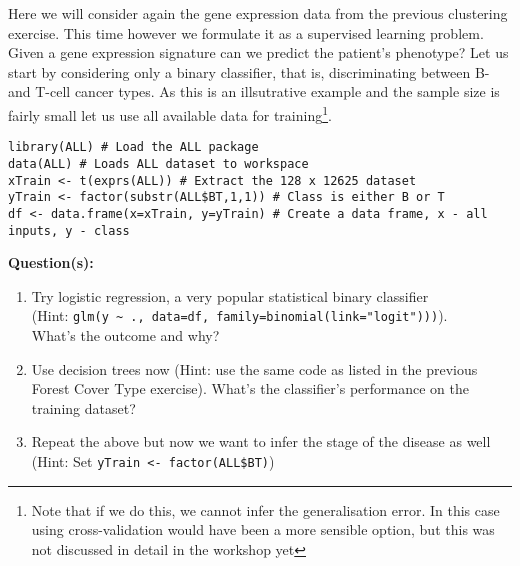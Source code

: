 \documentclass[a4paper,11pt]{article}
\begin{document}
Here we will consider again the gene expression data from the previous clustering exercise. This
time however we formulate it as a supervised learning problem. Given a gene expression signature
can we predict the patient's phenotype? Let us start by considering only a binary classifier, that is,
discriminating between B- and T-cell cancer types. As this is an illsutrative example and the sample 
size is fairly small let us use all available data for training\footnote{Note that if we do this, we cannot infer the generalisation error.
In this case using cross-validation would have been a more sensible option, but this was not discussed in detail in the workshop yet}.
\\
\begin{lstlisting}[style=RCode]
library(ALL) # Load the ALL package
data(ALL) # Loads ALL dataset to workspace
xTrain <- t(exprs(ALL)) # Extract the 128 x 12625 dataset
yTrain <- factor(substr(ALL$BT,1,1)) # Class is either B or T
df <- data.frame(x=xTrain, y=yTrain) # Create a data frame, x - all inputs, y - class
\end{lstlisting}

\begin{framed}
\textbf{Question(s):}
\begin{enumerate}
	\item Try logistic regression, a very popular statistical binary classifier\\
	(Hint: {\lstinline[style=RCode, basicstyle=\normalsize\ttfamily] |glm(y ~ ., data=df, family=binomial(link="logit")))|}).\\
	What's the outcome and why?
	\item Use decision trees now (Hint: use the same code as listed in the previous Forest Cover Type exercise). What's the classifier's performance on the training dataset?
	\item Repeat the above but now we want to infer the stage of the disease as well (Hint: Set {\lstinline[style=RCode, basicstyle=\normalsize\ttfamily] |yTrain <- factor(ALL$BT)|})
	\vspace{-0.5cm} %
\end{enumerate}
\end{framed}

\end{document}
